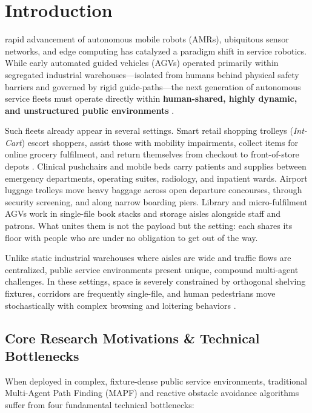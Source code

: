 \documentclass[journal]{IEEEtran}
\begin{document}
\IEEEpeerreviewmaketitle

\section{Introduction}
 rapid advancement of autonomous mobile robots (AMRs), ubiquitous sensor networks, and edge computing has catalyzed a paradigm shift in service robotics. While early automated guided vehicles (AGVs) operated primarily within segregated industrial warehouses—isolated from humans behind physical safety barriers and governed by rigid guide-paths—the next generation of autonomous service fleets must operate directly within \textbf{human-shared, highly dynamic, and unstructured public environments} \cite{azlan2024intcart, kruse2013human, chen2020relational}.

Such fleets already appear in several settings. Smart retail shopping trolleys (\textit{Int-Cart}) escort shoppers, assist those with mobility impairments, collect items for online grocery fulfilment, and return themselves from checkout to front-of-store depots \cite{azlan2024intcart}. Clinical pushchairs and mobile beds carry patients and supplies between emergency departments, operating suites, radiology, and inpatient wards. Airport luggage trolleys move heavy baggage across open departure concourses, through security screening, and along narrow boarding piers. Library and micro-fulfilment AGVs work in single-file book stacks and storage aisles alongside staff and patrons. What unites them is not the payload but the setting: each shares its floor with people who are under no obligation to get out of the way.

Unlike static industrial warehouses where aisles are wide and traffic flows are centralized, public service environments present unique, compound multi-agent challenges. In these settings, space is severely constrained by orthogonal shelving fixtures, corridors are frequently single-file, and human pedestrians move stochastically with complex browsing and loitering behaviors \cite{kruse2013human}.

\subsection{Core Research Motivations \& Technical Bottlenecks}
When deployed in complex, fixture-dense public service environments, traditional Multi-Agent Path Finding (MAPF) and reactive obstacle avoidance algorithms suffer from four fundamental technical bottlenecks:
\end{document}
